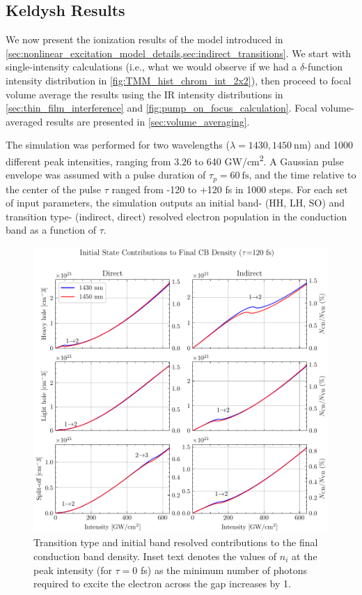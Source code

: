 \subsection{Keldysh Results}
\label{sec:nonlinear_excitation_results}

We now present the ionization results of the model introduced in \cref{sec:nonlinear_excitation_model_details,sec:indirect_transitions}. We start with single-intensity calculations (i.e., what we would observe if we had a $\delta$-function intensity distribution in \cref{fig:TMM_hist_chrom_int_2x2}), then proceed to focal volume average the results using the IR intensity distributions in \cref{sec:thin_film_interference} and \cref{fig:pump_on_focus_calculation}. Focal volume-averaged results are presented in \cref{sec:volume_averaging}.

The simulation was performed for two wavelengths ($\lambda = 1430, 1450 \ \textrm{nm}$) and 1000 different peak intensities, ranging from 3.26 to 640 GW/cm\textsuperscript{2}. A Gaussian pulse envelope was assumed with a pulse duration of $\tau_p = 60 \ \textrm{fs}$, and the time relative to the center of the pulse $\tau$ ranged from -120 to +120 fs in 1000 steps. For each set of input parameters, the simulation outputs an initial band- (HH, LH, SO) and transition type- (indirect, direct) resolved electron population in the conduction band as a function of $\tau$.

\begin{figure}
	\centering
	\includegraphics[width=1.0\textwidth]{figures/chap4/N_Channel_VB_resolved.pdf}
	\caption{Transition type and initial band resolved contributions to the final conduction band density. Inset text denotes the values of $n_i$ at the peak intensity (for $\tau=0$ fs) as the minimum number of photons required to excite the electron across the gap increases by 1.}
	\label{fig:N_Channel_VB_resolved}
\end{figure}

